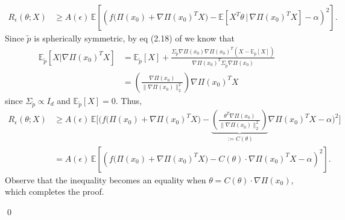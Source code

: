 \documentclass[11pt]{article}
\begin{document}
\begin{align*}
    R_{\epsilon}(\theta; X) &\geq A( \epsilon)\,\mathbb{E}\left[\left(f\Big(\Pi(x_0) + \nabla\Pi(x_0)^{T}X\Big)-\mathbb{E}\left[X^{T}\theta \, \Big| 
    \, \nabla\Pi(x_0)^{T}X\right] - \alpha\right)^2\right].
\end{align*}
Since $\tilde{p}$ is spherically symmetric, by eq (2.18) of \cite{shevlyakova2013sliced} we know that 
\begin{align}\mathbb{E}_{\tilde{p}}[X|\nabla\Pi(x_0)^TX] &= \mathbb{E}_{\tilde{p}}[X] + \frac{\Sigma_{\tilde{p}}\nabla\Pi(x_0)\nabla\Pi(x_0)^T(X - \mathbb{E}_{\tilde{p}}[X])}{\nabla\Pi(x_0)^T\Sigma_{\tilde{p}}\nabla\Pi(x_0)} \\
&= \left(\frac{\nabla\Pi(x_0)}{\|\nabla\Pi(x_0)\|_2^2}\right)\nabla\Pi(x_0)^TX
\end{align}
since $\Sigma_{\tilde{p}} \propto I_d$ and $\mathbb{E}_{\tilde{p}}[X] = 0$. Thus,
\begin{align*}
    R_{\epsilon}(\theta; X) &\geq A(\epsilon)\,\mathbb{E}\Bigg[\bigg(f\Big(\Pi(x_0) + \nabla\Pi(x_0)^{T}X\Big)-\underbrace{\left(\frac{\theta^T\nabla\Pi(x_0)}{\|\nabla\Pi(x_0)\|_2^2}\right)}_{:=C(\theta)}\nabla\Pi(x_0)^TX -\alpha\bigg)^2\Bigg] \\
    &= A(\epsilon)\,\mathbb{E}\left[\left(f\Big(\Pi(x_0) + \nabla\Pi(x_0)^{T}X\Big)-C(\theta)\cdot\nabla\Pi(x_0)^{T}X -\alpha\right)^2\right].
\end{align*}
Observe that the inequality becomes an equality when $\theta = C(\theta) \cdot\nabla\Pi(x_0)$, which completes the proof.

\qed{}
\end{document}
